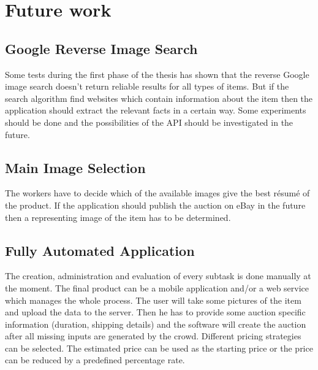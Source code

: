 \section{Future work}
\subsection{Google Reverse Image Search}
Some tests during the first phase of the thesis has shown that the reverse Google image search doesn't return reliable results for all types of items. But if the search algorithm find websites which contain information about the item then the application should extract the relevant facts in a certain way. Some experiments should be done and the possibilities of the API should be investigated in the future. 
\subsection{Main Image Selection}
The workers have to decide which of the available images give the best r\'{e}sum\'{e} of the product. If the application should publish the auction on eBay in the future then a representing image of the item has to be determined. 
\subsection{Fully Automated Application}
The creation, administration and evaluation of every subtask is done manually at the moment. The final product can be a mobile application and/or a web service which manages the whole process. The user will take some pictures of the item and upload the data to the server. Then he has to provide some auction specific information (duration, shipping details) and the software will create the auction after all missing inputs are generated by the crowd. Different pricing strategies can be selected. The estimated price can be used as the starting price or the price can be reduced by a predefined percentage rate. 
